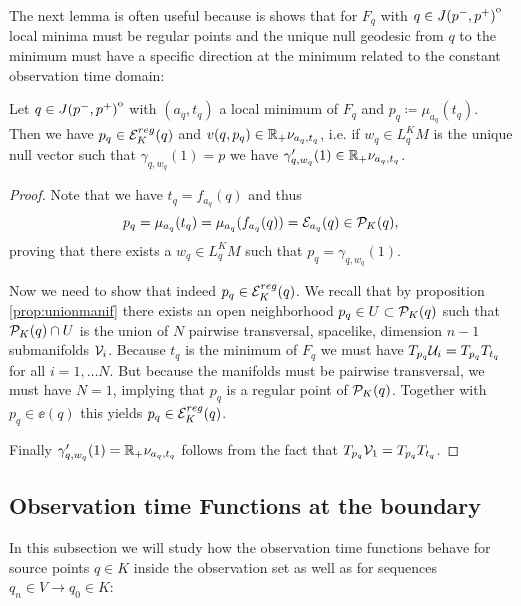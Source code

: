 The next lemma is often useful because is shows that for $F_q$ with $q\in {\kern0ptJ(p^-,p^+)}^{\mathrm{o}}$ local minima must be regular points and the unique null geodesic from $q$ to the minimum must have a specific direction at the minimum related to the constant observation time domain:
\begin{lemma}\label{lem:amin}
    Let $q\in {\kern0ptJ(p^-,p^+)}^{\mathrm{o}}$ with $(a_q,t_q)$ a local minimum of $F_q$ and $p_q\coloneqq \mu_{a_q}(t_q)$. Then we have $p_q\in {{\mathcal{E}}^{reg}_K}(q)$ and $v(q,p_q)\in \mathbb{R}_+\nu_{a_q,t_q}$, i.e. if $w_q\in L^K_qM$ is the unique null vector such that $\gamma_{q,w_q}(1)=p$ we have $\gamma'_{q,w_q}(1)\in \mathbb{R}_+\nu_{a_q,t_q}$.
\end{lemma}
\begin{proof}
    Note that we have $t_q = f_{a_q}(q)$ and thus 
    \[
        p_q =\mu_{a_q}(t_q) = \mu_{a_q}(f_{a_q}(q)) = {\mathcal{E}}_{a_q}(q)\in {{\mathcal{P}}_K(q)},
    \] proving that there exists a $w_q\in L^K_qM$ such that $p_q = \gamma_{q,w_q}(1)$. 

    Now we need to show that indeed $p_q\in {{\mathcal{E}}^{reg}_K}(q)$.
    We recall that by proposition \ref{prop:unionmanif} there exists an open neighborhood $p_q\in U\subset {\mathcal{P}}_K(q)$ such that ${\mathcal{P}}_K(q)\cap U$ is the union of $N$ pairwise transversal, spacelike, dimension $n-1$ submanifolds ${\mathcal{V}}_i$. Because $t_q$ is the minimum of $F_q$ we must have $T_{p_q}{{\mathcal{U}}_i} = T_{p_q}{T_{t_q}}$ for all $i=1,\dots N$. But because the manifolds must be pairwise transversal, we must have $N=1$, implying that $p_q$ is a regular point of ${\mathcal{P}}_K(q)$. Together with $p_q\in \ee(q)$ this yields $p_q \in {{\mathcal{E}}^{reg}_K}(q)$.

    Finally $\gamma'_{q,w_q}(1)=\mathbb{R}_+\nu_{a_q,t_q}$ follows from the fact that $T_{p_q}{{\mathcal{V}}_1} = T_{p_q}{T_{t_q}}$.
\end{proof}

\subsection{Observation time Functions at the boundary}
In this subsection we will study how the observation time functions behave for source points $q\in K$ inside the observation set as well as for sequences $q_n \in V \to q_0\in K$:

